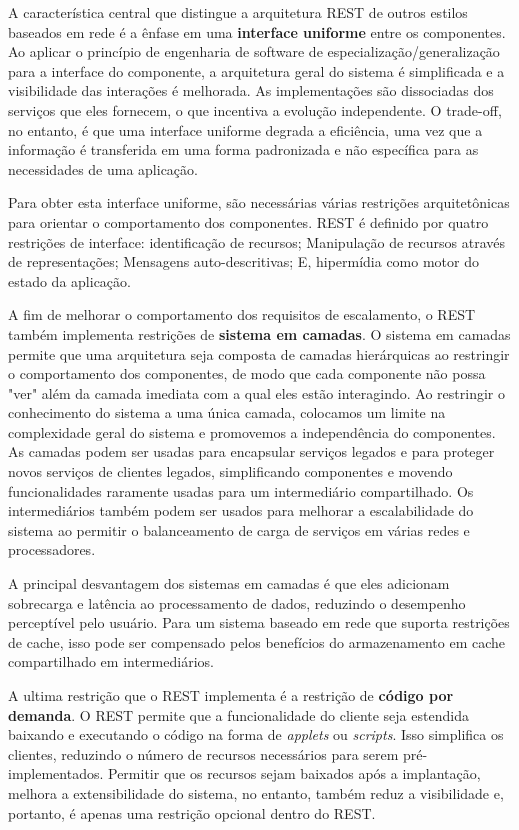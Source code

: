 A característica central que distingue a arquitetura REST de outros estilos baseados em rede é a ênfase em uma \textbf{interface uniforme} entre os componentes. Ao aplicar o princípio de engenharia de software de especialização/generalização para a interface do componente, a arquitetura geral do sistema é simplificada e a visibilidade das interações é melhorada. As implementações são dissociadas dos serviços que eles fornecem, o que incentiva a evolução independente. O trade-off, no entanto, é que uma interface uniforme degrada a eficiência, uma vez que a informação é transferida em uma forma padronizada e não específica para as necessidades de uma aplicação.

Para obter esta interface uniforme, são necessárias várias restrições arquitetônicas para orientar o comportamento dos componentes. REST é definido por quatro restrições de interface: identificação de recursos; Manipulação de recursos através de representações; Mensagens auto-descritivas; E, hipermídia como motor do estado da aplicação.

A fim de melhorar o comportamento dos requisitos de escalamento, o REST também implementa restrições de \textbf{sistema em camadas}. O sistema em camadas permite que uma arquitetura seja composta de camadas hierárquicas ao restringir o comportamento dos componentes, de modo que cada componente não possa "ver" além da camada imediata com a qual eles estão interagindo. Ao restringir o conhecimento do sistema a uma única camada, colocamos um limite na complexidade geral do sistema e promovemos a independência do componentes. As camadas podem ser usadas para encapsular serviços legados e para proteger novos serviços de clientes legados, simplificando componentes e movendo funcionalidades raramente usadas para um intermediário compartilhado. Os intermediários também podem ser usados para melhorar a escalabilidade do sistema ao permitir o balanceamento de carga de serviços em várias redes e processadores.

A principal desvantagem dos sistemas em camadas é que eles adicionam sobrecarga e latência ao processamento de dados, reduzindo o desempenho perceptível pelo usuário. Para um sistema baseado em rede que suporta restrições de cache, isso pode ser compensado pelos benefícios do armazenamento em cache compartilhado em intermediários.

A ultima restrição que o REST implementa é a restrição de \textbf{código por demanda}. O REST permite que a funcionalidade do cliente seja estendida baixando e executando o código na forma de \textit{applets} ou \textit{scripts}. Isso simplifica os clientes, reduzindo o número de recursos necessários para serem pré-implementados. Permitir que os recursos sejam baixados após a implantação, melhora a extensibilidade do sistema, no entanto, também reduz a visibilidade e, portanto, é apenas uma restrição opcional dentro do REST.

